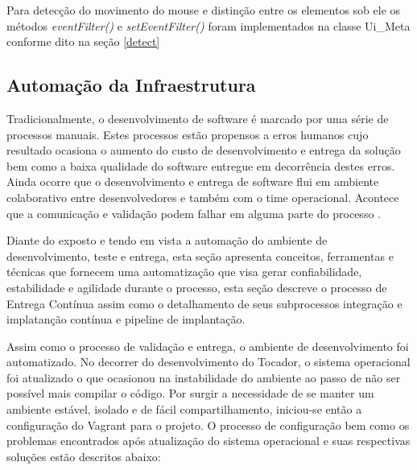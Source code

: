 Para detecção do movimento do mouse e distinção entre os elementos sob ele os métodos \textit{eventFilter()} e \textit{setEventFilter()} foram implementados na classe Ui\_Meta conforme dito na seção \ref{detect}



\subsection{Automação da Infraestrutura}\label{analiseestatica}


Tradicionalmente, o desenvolvimento de software é marcado por uma série de processos manuais. Estes processos estão propensos a erros humanos cujo resultado ocasiona o aumento do custo de desenvolvimento e entrega da solução bem como a baixa qualidade do software entregue em decorrência destes erros. Ainda ocorre que o desenvolvimento e entrega de software flui em ambiente colaborativo entre desenvolvedores e também com o time operacional. Acontece que a comunicação e validação podem falhar em alguma parte do processo \cite{braga2015devops}. 

Diante do exposto e tendo em vista a automação do ambiente de desenvolvimento, teste e entrega, esta seção apresenta conceitos, ferramentas e técnicas que fornecem uma automatização que visa gerar confiabilidade, estabilidade e agilidade durante o processo, esta seção descreve o processo de Entrega Contínua assim como o detalhamento de seus subprocessos integração e implatanção contínua e pipeline de implantação.

Assim como o processo de validação e entrega, o ambiente de desenvolvimento foi automatizado. No decorrer do desenvolvimento do Tocador, o sistema operacional foi atualizado o que ocasionou na instabilidade do ambiente ao passo de não ser possível mais compilar o código. Por surgir a necessidade de se manter um ambiente estável, isolado e de fácil compartilhamento, iniciou-se então a configuração do Vagrant para o projeto. O processo de configuração bem como os problemas encontrados após atualização do sistema operacional e suas respectivas soluções estão descritos abaixo:

